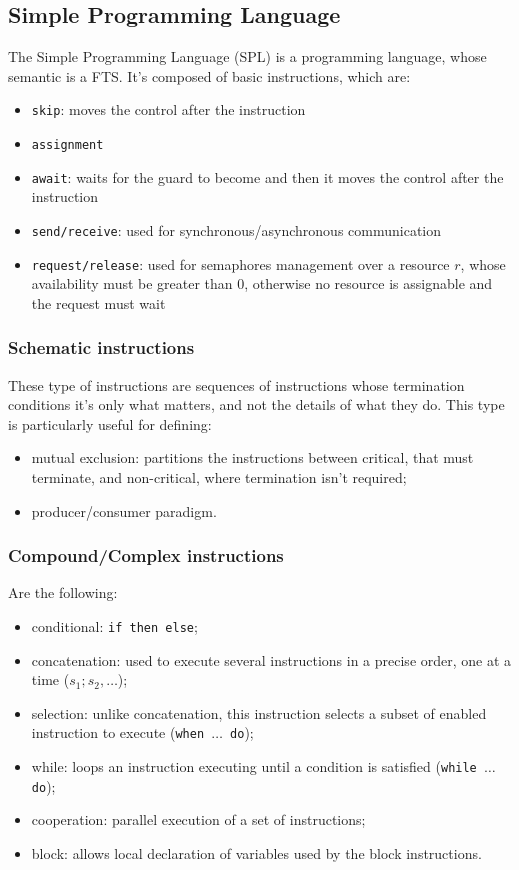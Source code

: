 \documentclass[oneside]{academica}
\begin{document}
\subsection{Simple Programming Language}

The Simple Programming Language (SPL) is a programming language, whose semantic is a FTS.
It's composed of basic instructions, which are:
\begin{itemize}
  \item \texttt{skip}: moves the control after the instruction
  \item \texttt{assignment}
  \item \texttt{await}: waits for the guard to become \true and then it moves the control after the instruction
  \item \texttt{send/receive}: used for synchronous/asynchronous communication
  \item \texttt{request/release}: used for semaphores management over a resource $r$, whose availability must be greater than 0, otherwise no resource is assignable and the request must wait
\end{itemize}

\subsubsection{Schematic instructions}

These type of instructions are sequences of instructions whose termination conditions it's only what matters, and not the details of what they do.
This type is particularly useful for defining:
\begin{itemize}
  \item mutual exclusion: partitions the instructions between critical, that must terminate, and non-critical, where termination isn't required;
  \item producer/consumer paradigm.
\end{itemize}

\subsubsection{Compound/Complex instructions}

Are the following:
\begin{itemize}
  \item conditional: \texttt{if then else};
  \item concatenation: used to execute several instructions in a precise order, one at a time ($s_1;s_2,\ldots$);
  \item selection: unlike concatenation, this instruction selects a subset of enabled instruction to execute (\texttt{when $\ldots$ do});
  \item while: loops an instruction executing until a condition is satisfied (\texttt{while $\ldots$ do});
  \item cooperation: parallel execution of a set of instructions;
  \item block: allows local declaration of variables used by the block instructions.
\end{itemize}
\end{document}
